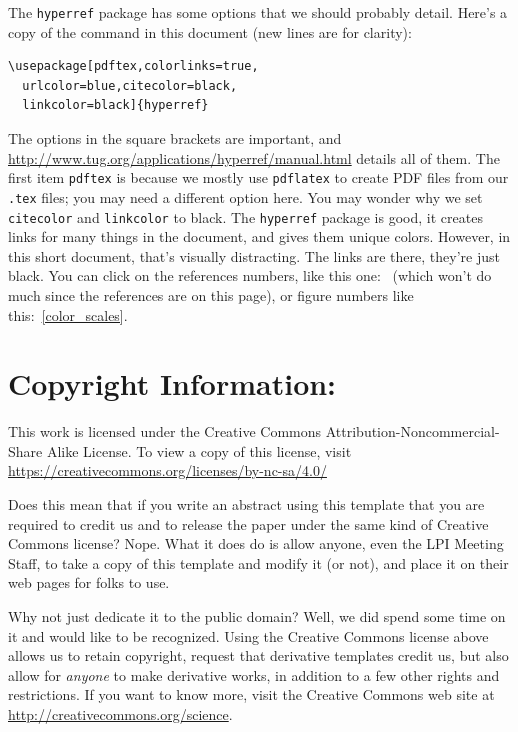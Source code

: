 \documentclass[twoside, 10pt]{article}
\begin{document}
The \verb=hyperref= package has some options that we should probably 
detail.  Here's a copy of the command in this document (new lines
are for clarity):
\begin{verbatim}
\usepackage[pdftex,colorlinks=true,
  urlcolor=blue,citecolor=black,
  linkcolor=black]{hyperref}
\end{verbatim}
\noindent
The options in the square brackets are important, and
\href{http://www.tug.org/applications/hyperref/manual.html}{http://www.tug.org/applications/hyperref/manual.html} details
all of them.  The first item \verb=pdftex= is because we mostly use
\verb=pdflatex= to create PDF files from our \verb=.tex= files; you may 
need a different option here.  You may wonder
why we set \verb=citecolor= and \verb=linkcolor= to black.  The
\verb=hyperref= package is good, it creates links for many 
things in the document, and gives them unique colors.
However, in this short document, that's visually distracting. 
The links are there, they're just black. You can click on the references
numbers, like this one:~\citep{kopka2003guide} (which won't do much since
the references are on this page), or figure numbers like
this:~\ref{color_scales}.


\section*{Copyright Information:}

This work is licensed under the Creative Commons
Attribution-Noncommercial-Share Alike License. To view a copy
of this license, visit \href{https://creativecommons.org/licenses/by-nc-sa/4.0/}{https://creativecommons.org/licenses/by-nc-sa/4.0/}

Does this mean that if you write an abstract using this template that
you are required to credit us and to release the paper under
the same kind of Creative Commons license?  Nope. What it does do is allow
anyone, even the LPI Meeting Staff, to take a copy of this template
and modify it (or not), and place it on their web pages for folks
to use.

Why not just dedicate it to the public domain?  Well,
we did spend some time on it and would like to be recognized.  Using
the Creative Commons license above allows us to retain copyright,
request that derivative templates credit us, but also allow for
\emph{anyone} to make derivative works, in addition to a few other
rights and restrictions.  If you want to know more, visit the
Creative Commons web site at \href{https://creativecommons.org/science/}{http://creativecommons.org/science}.
\end{document}
